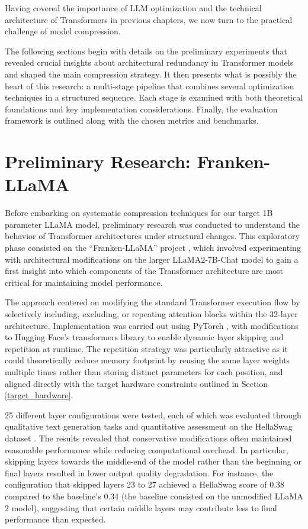 
Having covered the importance of LLM optimization and the technical architecture of Transformers in previous chapters, we now turn to the practical challenge of model compression.

The following sections begin with details on the preliminary experiments that revealed crucial insights about architectural redundancy in Transformer models and shaped the main compression strategy. It then presents what is possibly the heart of this research: a multi-stage pipeline that combines several optimization techniques in a structured sequence. Each stage is examined with both theoretical foundations and key implementation considerations. Finally, the evaluation framework is outlined along with the chosen metrics and benchmarks.

\section{Preliminary Research: Franken-LLaMA} \label{frankenllama}

Before embarking on systematic compression techniques for our target 1B parameter LLaMA model, preliminary research was conducted to understand the behavior of Transformer architectures under structural changes. This exploratory phase consisted on the ``Franken-LLaMA'' project \cite{franken-llama}, which involved experimenting with architectural modifications on the larger LLaMA2-7B-Chat model \cite{llama2} to gain a first insight into which components of the Transformer architecture are most critical for maintaining model performance.

The approach centered on modifying the standard Transformer execution flow by selectively including, excluding, or repeating attention blocks within the 32-layer architecture. Implementation was carried out using PyTorch \cite{pytorch}, with modifications to Hugging Face's transformers library \cite{hf_transformers} to enable dynamic layer skipping and repetition at runtime. The repetition strategy was particularly attractive as it could theoretically reduce memory footprint by reusing the same layer weights multiple times rather than storing distinct parameters for each position, and aligned directly with the target hardware constraints outlined in Section \ref{target_hardware}.

25 different layer configurations were tested, each of which was evaluated through qualitative text generation tasks and quantitative assessment on the HellaSwag dataset \cite{hellaswag}.
The results revealed that conservative modifications often maintained reasonable performance while reducing computational overhead. In particular, skipping layers towards the middle-end of the model rather than the beginning or final layers resulted in lower output quality degradation. For instance, the configuration that skipped layers 23 to 27 achieved a HellaSwag score of 0.38 compared to the baseline's 0.34 (the baseline consisted on the unmodified LLaMA 2 model), suggesting that certain middle layers may contribute less to final performance than expected.

